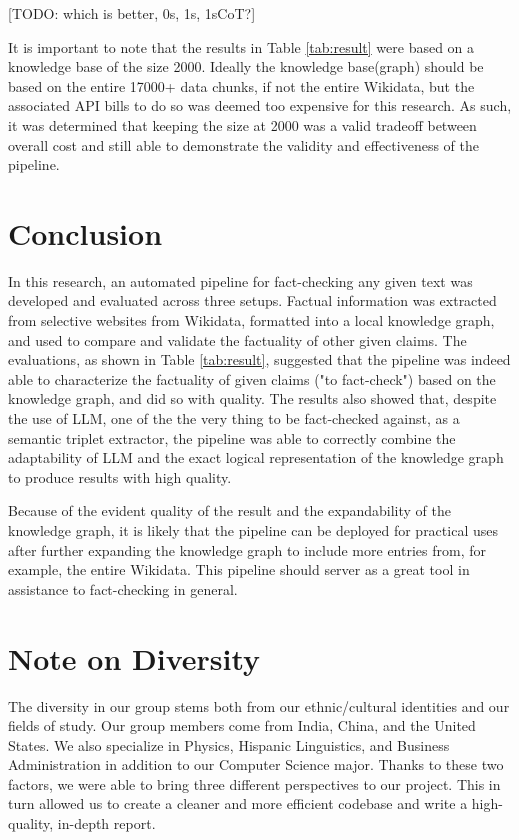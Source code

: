 \documentclass[11pt]{article}
\begin{document}
[TODO: which is better, 0s, 1s, 1sCoT?]

It is important to note that the results in Table \ref{tab:result} were based on a knowledge base of the size 2000. Ideally the knowledge base(graph) should be based on the entire 17000+ data chunks, if not the entire Wikidata, but the associated API bills to do so was deemed too expensive for this research. As such, it was determined that keeping the size at 2000 was a valid tradeoff between overall cost and still able to demonstrate the validity and effectiveness of the pipeline. 

\section{Conclusion}
In this research, an automated pipeline for fact-checking any given text was developed and evaluated across three setups. Factual information was extracted from selective websites from Wikidata, formatted into a local knowledge graph, and used to compare and validate the factuality of other given claims. The evaluations, as shown in Table \ref{tab:result}, suggested that the pipeline was indeed able to characterize the factuality of given claims ("to fact-check") based on the knowledge graph, and did so with quality. The results also showed that, despite the use of LLM, one of the the very thing to be fact-checked against, as a semantic triplet extractor, the pipeline was able to correctly combine the adaptability of LLM and the exact logical representation of the knowledge graph to produce results with high quality. 

Because of the evident quality of the result and the expandability of the knowledge graph, it is likely that the pipeline can be deployed for practical uses after further expanding the knowledge graph to include more entries from, for example, the entire Wikidata. This pipeline should server as a great tool in assistance to fact-checking in general. 

\section*{Note on Diversity}
The diversity in our group stems both from our ethnic/cultural identities and our fields of study. Our group members come from India, China, and the United States. We also specialize in Physics, Hispanic Linguistics, and Business Administration in addition to our Computer Science major. Thanks to these two factors, we were able to bring three different perspectives to our project. This in turn allowed us to create a cleaner and more efficient codebase and write a high-quality, in-depth report.
\end{document}
